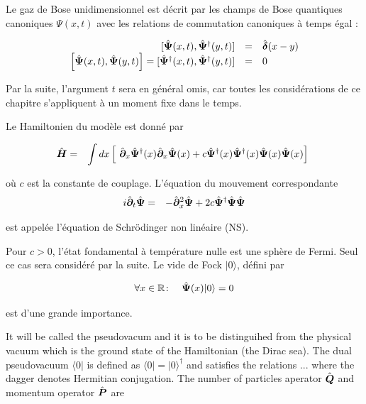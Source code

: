 Le gaz de Bose unidimensionnel est décrit par les champs de Bose quantiques canoniques \( \Psi(x, t) \) avec les relations de commutation canoniques à temps égal :

\begin{eqnarray}
	\left . \begin{array}{rcl}
		[ \hat{\bm{\Psi}}(x, t),  \hat{\bm{\Psi}}^\dagger(y, t) ]  &=&  \hat{\bm{\delta}}(x - y) \\
		\left [ \hat{\bm{\Psi}}(x, t),  \hat{\bm{\Psi}}(y, t) \right ]   =  [ \hat{\bm{\Psi}}^\dag(x, t),  \hat{\bm{\Psi}}^\dag(y, t) ]  &=&  0 
	\end{array} \right . \label{eq.1.1}
\end{eqnarray}

Par la suite, l'argument \( t \) sera en général omis, car toutes les considérations de ce chapitre s'appliquent à un moment fixe dans le temps.

Le Hamiltonien du modèle est donné par

\begin{eqnarray}
	\operator{H} & = & \int dx \left [ \operator{\partial}_x \operator{\Psi}^\dag (x) \operator{\partial}_x \operator{\Psi}(x) + c \operator{\Psi}^\dag (x) \operator{\Psi}^\dag (x) \operator{\Psi} (x) \operator{\Psi} (x) \right ] 
\end{eqnarray}


où \( c \) est la constante de couplage. L'équation du mouvement correspondante
\begin{eqnarray}
	i \hat{\bm{\partial}}_t \hat{\bm{\Psi}}	 & = & - \hat{\bm{\partial}}_x^2 \hat{\bm{\Psi}} + 2 c \hat{\bm{\Psi}}^\dag\hat{\bm{\Psi}} \hat{\bm{\Psi}}
\end{eqnarray}

est appelée l'équation de Schrödinger non linéaire (NS).

Pour $c > 0$, l'état fondamental à température nulle est une sphère de Fermi. Seul ce cas sera considéré par la suite. Le vide de Fock $\vert 0 \rangle$, défini par 


\begin{eqnarray}
	\forall x \in \mathbb{R} & \colon & \hat{\bm{\Psi}} (x) \vert 0 \rangle = 	0 \label{eq.1.4}
\end{eqnarray}

est d'une grande importance.

It will be called the pseudovacum and it is to be distinguihed from the physical vacuum which is the ground state of the Hamiltonian (the Dirac sea). The dual pseudovacuum $\langle 0 \vert$ is defined as $\langle 0 \vert =  \vert 0 \rangle^\dag$ and satisfies the relations ... where the dagger denotes Hermitian conjugation. The number of particles aperator $\hat{\bm{Q}}$ and momentum operator $\hat{\bm{P}}$ are 

